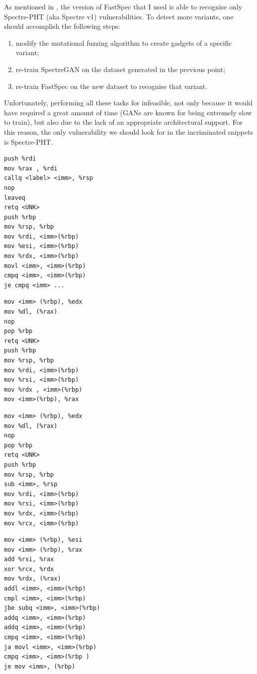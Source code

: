 \documentclass[12pt,a4paper]{book}
\theoremstyle{definition}
\begin{document}
	As mentioned in \cite{Tol2021}, the version of FastSpec that I used is able to recognise only Spectre-PHT (aka Spectre v1) vulnerabilities. To detect more variants, one should accomplish the following steps:
	\begin{enumerate}
		\item modify the mutational fuzzing algorithm to create gadgets of a specific variant;
		\item re-train SpectreGAN on the dataset generated in the previous point;
		\item re-train FastSpec on the new dataset to recognise that variant.
	\end{enumerate}
	Unfortunately, performing all these tasks for infeasible, not only because it would have required a great amount of time (GANs are known for being extremely slow to train), but also due to the lack of an appropriate architectural support. For this reason, the only vulnerability we should look for in the incriminated snippets is Spectre-PHT.
		
	\begin{minipage}{.45\textwidth}
		\begin{lstlisting}[caption={Window 369-379}]
push %rdi
mov %rax , %rdi
callq <label> <imm>, %rsp
nop
leaveq
retq <UNK>
push %rbp
mov %rsp, %rbp
mov %rdi, <imm>(%rbp)
mov %esi, <imm>(%rbp)
mov %rdx, <imm>(%rbp)
movl <imm>, <imm>(%rbp)
cmpq <imm>, <imm>(%rbp)
je cmpq <imm> ...
		\end{lstlisting}
	\end{minipage}\hfill
	\begin{minipage}{.45\textwidth}
		\begin{lstlisting}[caption={Window 7992-7997}]
mov <imm> (%rbp), %edx
mov %dl, (%rax)
nop
pop %rbp
retq <UNK>
push %rbp
mov %rsp, %rbp
mov %rdi, <imm>(%rbp)
mov %rsi, <imm>(%rbp)
mov %rdx , <imm>(%rbp)
mov <imm>(%rbp), %rax
		\end{lstlisting}
	\end{minipage}

	\begin{minipage}{.45\textwidth}
	\begin{lstlisting}[caption={Window 11024-11031}]
mov <imm> (%rbp), %edx
mov %dl, (%rax)
nop
pop %rbp
retq <UNK>
push %rbp
mov %rsp, %rbp
sub <imm>, %rsp
mov %rdi, <imm>(%rbp)
mov %rsi, <imm>(%rbp)
mov %rdx, <imm>(%rbp)
mov %rcx, <imm>(%rbp)
	\end{lstlisting}
\end{minipage}\hfill
\begin{minipage}{.45\textwidth}
	\begin{lstlisting}[caption={Window 11351-11392}]
mov <imm> (%rbp), %esi
mov <imm> (%rbp), %rax
add %rsi, %rax
xor %rcx, %rdx
mov %rdx, (%rax)
addl <imm>, <imm>(%rbp)
cmpl <imm>, <imm>(%rbp)
jbe subq <imm>, <imm>(%rbp)
addq <imm>, <imm>(%rbp)
addq <imm>, <imm>(%rbp)
cmpq <imm>, <imm>(%rbp)
ja movl <imm>, <imm>(%rbp)
cmpq <imm>, <imm>(%rbp )
je mov <imm>, (%rbp)
	\end{lstlisting}
\end{minipage}
\end{document}
